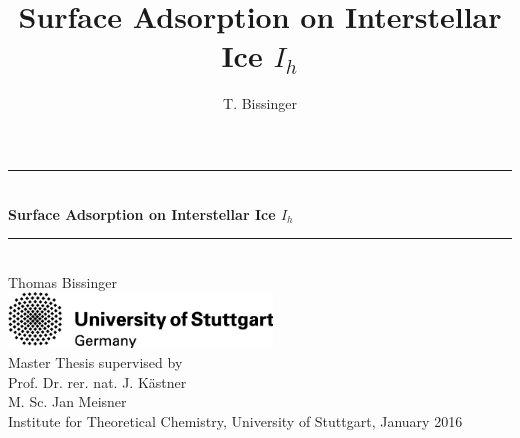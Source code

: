\documentclass[8.5pt,twoside,twocolumn]{article}
\title{Surface Adsorption on Interstellar Ice $I_h$}
\author{T. Bissinger}
\theoremstyle{standard}
\begin{document}
\begin{titlepage}

\begin{center}


 


\newcommand{\HRule}{\rule{\linewidth}{0.5mm}}

\HRule \\[0.4cm]

{ \huge \bfseries Surface Adsorption on Interstellar Ice $I_h$}


\HRule \\[2cm]

{\LARGE Thomas Bissinger}\\[4cm]

\vfill 
\includegraphics[width=7cm]{./img/unilogo_international.png}\\[2cm]   

{\Large Master Thesis supervised by \\[.7cm]
Prof. Dr. rer. nat. J. Kästner \\[.4cm]
M. Sc. Jan Meisner}\\[.4cm]


{ \Large  Institute for Theoretical Chemistry, University of Stuttgart, January
2016}




\end{center}


\end{titlepage}
\newpage
\newpage
\clearpage
\end{document}
